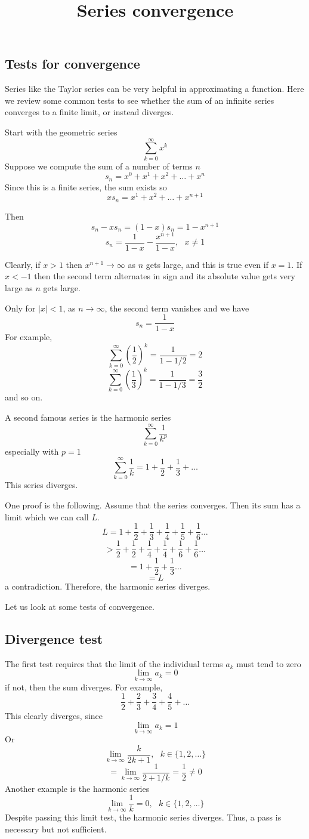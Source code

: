 \documentclass[11pt, oneside]{article}
\title{Series convergence}
\date{}
\begin{document}
\maketitle
\Large

\subsection*{Tests for convergence}
Series like the Taylor series can be very helpful in approximating a function.  Here we review some common tests to see whether the sum of an infinite series converges to a finite limit, or instead diverges.

Start with the geometric series
\[ \sum_{k=0}^{\infty} x^k \]
Suppose we compute the sum of a number of terms $n$
\[ s_n = x^0 + x^1 + x^2 + \dots + x^n \]
Since this is a finite series, the sum exists so
\[ x s_n = x^1 + x^2 + \dots + x^{n+1} \]

Then
\[ s_n - x s_n = (1-x) s_n = 1 - x^{n+1} \]
\[ s_n = \frac{1}{1-x} - \frac{x^{n+1}}{1-x}, \ \ \ x \ne 1 \]

Clearly, if $x>1$ then $x^{n+1} \rightarrow \infty$ as $n$ gets large, and this is true even if $x = 1$.  If $x<-1$ then the second term alternates in sign and its absolute value gets very large as $n$ gets large.  

Only for $|x| < 1$, as $n \rightarrow \infty$, the second term vanishes and we have
\[ s_n = \frac{1}{1-x} \]
For example,
\[ \sum_{k=0}^{\infty} (\frac{1}{2})^k = \frac{1}{1-1/2} = 2 \]
\[ \sum_{k=0}^{\infty} (\frac{1}{3})^k = \frac{1}{1-1/3} = \frac{3}{2} \]
and so on.

A second famous series is the harmonic series
\[ \sum_{k=0}^{\infty} \frac{1}{k^p} \]
especially with $p=1$
\[ \sum_{k=0}^{\infty} \frac{1}{k} = 1 + \frac{1}{2} + \frac{1}{3} + \dots \]
This series diverges.  

One proof is the following.  Assume that the series converges.  Then its sum has a limit which we can call $L$.
\[ L = 1 + \frac{1}{2} + \frac{1}{3} + \frac{1}{4} +  \frac{1}{5} +  \frac{1}{6} \dots \]
\[ > \frac{1}{2} + \frac{1}{2} + \frac{1}{4} + \frac{1}{4} +  \frac{1}{6} +  \frac{1}{6}  \dots \]
\[ = 1 + \frac{1}{2} + \frac{1}{3} \dots \]
\[ = L \]
a contradiction.  Therefore, the harmonic series diverges.

Let us look at some tests of convergence.

\subsection*{Divergence test}
The first test requires that the limit of the individual terms $a_k$ must tend to zero
\[ \lim_{k \rightarrow \infty} a_k = 0 \]
if not, then the sum diverges.  For example,
\[ \frac{1}{2} + \frac{2}{3} + \frac{3}{4} + \frac{4}{5} + \dots \]
This clearly diverges, since
\[ \lim_{k \rightarrow \infty} a_k = 1 \]
Or
\[ \lim_{k \rightarrow \infty} \frac{k}{2k + 1}, \ \ \ k \in \{1,2,\dots\} \]
\[ = \lim_{k \rightarrow \infty} \frac{1}{2 + 1/k} = \frac{1}{2} \ne 0 \]
Another example is the harmonic series
\[ \lim_{k \rightarrow \infty} \frac{1}{k} = 0, \ \ \ k \in \{1,2,\dots\} \]
Despite passing this limit test, the harmonic series diverges.  Thus, a pass is necessary but not sufficient.
\end{document}
